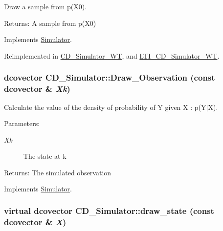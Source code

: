 Draw a sample from p(X0). 

\begin{Desc}
\item[Returns:]A sample from p(X0) \end{Desc}


Implements \hyperlink{class_simulator_29b9603eb2be9139972816329e8663dc}{Simulator}.

Reimplemented in \hyperlink{class_c_d___simulator___w_t_c05069bbef8e4ff83247f77476b2afe1}{CD\_\-Simulator\_\-WT}, and \hyperlink{class_l_t_i___c_d___simulator___w_t_a63eaac608a5f214468dc13d34f8f20f}{LTI\_\-CD\_\-Simulator\_\-WT}.\hypertarget{class_c_d___simulator_3770eddf939898b6dccc39a556eaf8c9}{
\subsubsection[{Draw\_\-Observation}]{\setlength{\rightskip}{0pt plus 5cm}dcovector CD\_\-Simulator::Draw\_\-Observation (const dcovector \& {\em Xk})}}
\label{class_c_d___simulator_3770eddf939898b6dccc39a556eaf8c9}


Calculate the value of the density of probability of Y given X : p(Y$|$X). 

\begin{Desc}
\item[Parameters:]
\begin{description}
\item[{\em Xk}]The state at k\end{description}
\end{Desc}
\begin{Desc}
\item[Returns:]The simulated observation \end{Desc}


Implements \hyperlink{class_simulator_2fb966c2c2a4c93bb6788e15563c9006}{Simulator}.\hypertarget{class_c_d___simulator_11c411df9b1e0d6f8576edefd723dd47}{
\subsubsection[{draw\_\-state}]{\setlength{\rightskip}{0pt plus 5cm}virtual dcovector CD\_\-Simulator::draw\_\-state (const dcovector \& {\em X})}}
\label{class_c_d___simulator_11c411df9b1e0d6f8576edefd723dd47}




